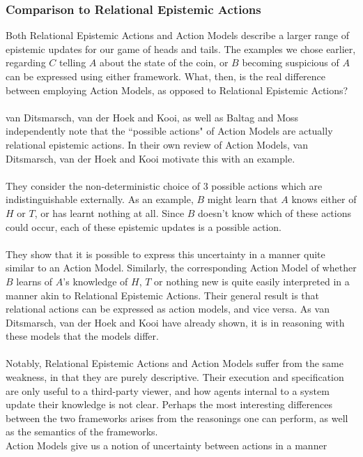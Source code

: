 \documentclass[12pt, a4paper, twoside]{article}
\begin{document}
\subsubsection{Comparison to Relational Epistemic Actions} \label{epi_compare}
Both Relational Epistemic Actions and Action Models describe a larger range of
epistemic updates for our game of heads and tails.
The examples we chose earlier, regarding $C$ telling $A$ about the state of the
coin, or $B$ becoming suspicious of $A$ can be expressed using either framework.
What, then, is the real difference between employing Action Models, as opposed
to Relational Epistemic Actions?\\
\\
van Ditsmarsch, van der Hoek and Kooi, as well as Baltag and Moss independently
note that the ``possible actions" of Action Models  are actually relational
epistemic actions.
In their own review of Action Models, van Ditsmarsch, van der Hoek and Kooi
motivate this with an example.\\
\\
They consider the non-deterministic choice of 3 possible actions which are
indistinguishable externally.
As an example, $B$ might learn that $A$ knows either of $H$ or $T$, or has
learnt nothing at all.
Since $B$ doesn't know which of these actions could occur, each of these
epistemic updates is a possible action.\\
\\
They show that it is possible to express this uncertainty in a manner quite similar
to an Action Model.
Similarly, the corresponding Action Model of whether $B$ learns of $A$'s
knowledge of $H$, $T$ or nothing new is quite easily interpreted in a manner
akin to Relational Epistemic Actions.
Their general result is that relational actions can be expressed as action
models, and vice versa.
As van Ditsmarsch, van der Hoek and Kooi have already shown, it is in reasoning
with these models that the models differ.\\
\\
Notably, Relational Epistemic Actions and Action Models suffer from the same
weakness, in that they are purely descriptive.
Their execution and specification are only useful to a third-party viewer, and
how agents internal to a system update their knowledge is not clear.
Perhaps the most interesting differences between the two frameworks arises from
the reasonings one can perform, as well as the semantics of the frameworks.
\\
Action Models give us a notion of uncertainty between actions in a manner
\end{document}
